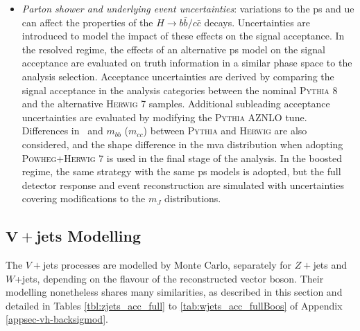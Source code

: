 \begin{itemize}[leftmargin=*]
    \item \textit{Parton shower and underlying event uncertainties}: variations to the \gls{ps} and \gls{ue} can affect the properties of the $H \rightarrow b\bar{b} / c\bar{c}$ decays. Uncertainties are introduced to model the impact of these effects on the signal acceptance. In the resolved regime, the effects of an alternative \gls{ps} model on the signal acceptance are evaluated on truth information in a similar phase space to the analysis selection. Acceptance uncertainties are derived by comparing the signal acceptance in the analysis categories between the nominal \textsc{Pythia} 8 and the alternative \textsc{Herwig} 7 samples. Additional subleading acceptance uncertainties are evaluated by modifying the \textsc{Pythia} AZNLO tune. Differences in \ptv\ and $m_{bb}$ ($m_{cc}$) between \textsc{Pythia} and \textsc{Herwig} are also considered, and the shape difference in the \gls{mva} distribution when adopting \textsc{Powheg}+\textsc{Herwig} 7 is used in the final stage of the analysis. In the boosted regime, the same strategy with the same \gls{ps} models is adopted, but the full detector response and event reconstruction are simulated with uncertainties covering modifications to the $m_J$ distributions.
\end{itemize}

\subsection[$V+$jets Modelling]{$\boldsymbol{V+}$jets Modelling}\label{sec-modVjet}
The $V+$jets processes are modelled by Monte Carlo, separately for $Z+$jets and $W$+jets, depending on the flavour of the reconstructed vector boson. Their modelling nonetheless shares many similarities, as described in this section and detailed in Tables \ref{tbl:zjets_acc_full} to \ref{tab:wjets_acc_fullBoos} of Appendix \ref{appsec-vh-backsigmod}.

